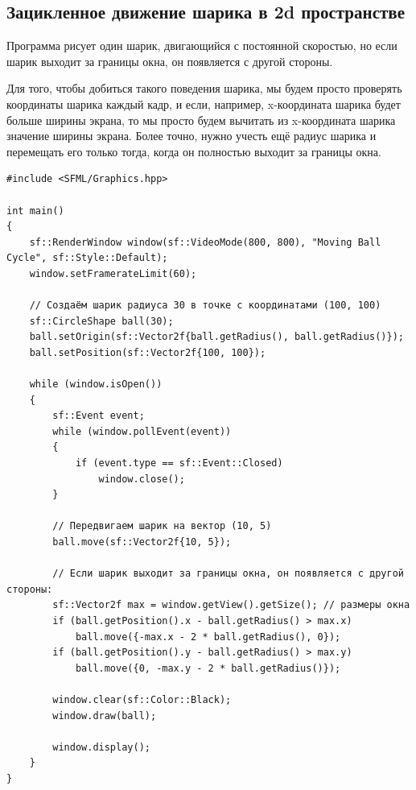 \documentclass{article}
\begin{document}
\subsection*{Зацикленное движение шарика в 2d пространстве}
Программа рисует один шарик, двигающийся с постоянной скоростью, но если шарик выходит за границы окна, он появляется с другой стороны.

Для того, чтобы добиться такого поведения шарика, мы будем просто проверять координаты шарика каждый кадр, и если, например, x-координата шарика будет больше ширины экрана, то мы просто будем вычитать из x-координата шарика значение ширины экрана. Более точно, нужно учесть ещё радиус шарика и перемещать его только тогда, когда он полностью выходит за границы окна.

\begin{lstlisting}
#include <SFML/Graphics.hpp>

int main()
{
    sf::RenderWindow window(sf::VideoMode(800, 800), "Moving Ball Cycle", sf::Style::Default);
    window.setFramerateLimit(60);
    
    // Создаём шарик радиуса 30 в точке с координатами (100, 100)
    sf::CircleShape ball(30);
    ball.setOrigin(sf::Vector2f{ball.getRadius(), ball.getRadius()});
    ball.setPosition(sf::Vector2f{100, 100});

    while (window.isOpen())
    {
        sf::Event event;
        while (window.pollEvent(event)) 
        {
            if (event.type == sf::Event::Closed)
                window.close();
        }
        
        // Передвигаем шарик на вектор (10, 5)
        ball.move(sf::Vector2f{10, 5});
	
		// Если шарик выходит за границы окна, он появляется с другой стороны:
        sf::Vector2f max = window.getView().getSize(); // размеры окна
        if (ball.getPosition().x - ball.getRadius() > max.x)
            ball.move({-max.x - 2 * ball.getRadius(), 0});
        if (ball.getPosition().y - ball.getRadius() > max.y)
            ball.move({0, -max.y - 2 * ball.getRadius()});

        window.clear(sf::Color::Black);
        window.draw(ball);

        window.display();
    }
}
\end{lstlisting}
\end{document}
